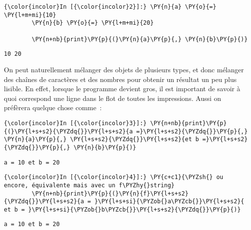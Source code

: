     \begin{Verbatim}[commandchars=\\\{\}]
{\color{incolor}In [{\color{incolor}2}]:} \PY{n}{a} \PY{o}{=} \PY{l+m+mi}{10}
        \PY{n}{b} \PY{o}{=} \PY{l+m+mi}{20}
        
        \PY{n+nb}{print}\PY{p}{(}\PY{n}{a}\PY{p}{,} \PY{n}{b}\PY{p}{)}
\end{Verbatim}


    \begin{Verbatim}[commandchars=\\\{\}]
10 20

    \end{Verbatim}

    On peut naturellement mélanger des objets de plusieurs types, et donc
mélanger des chaînes de caractères et des nombres pour obtenir un
résultat un peu plus lisible. En effet, lorsque le programme devient
gros, il est important de savoir à quoi correspond une ligne dans le
flot de toutes les impressions. Aussi on préfèrera quelque chose comme~:

    \begin{Verbatim}[commandchars=\\\{\}]
{\color{incolor}In [{\color{incolor}3}]:} \PY{n+nb}{print}\PY{p}{(}\PY{l+s+s2}{\PYZdq{}}\PY{l+s+s2}{a =}\PY{l+s+s2}{\PYZdq{}}\PY{p}{,} \PY{n}{a}\PY{p}{,} \PY{l+s+s2}{\PYZdq{}}\PY{l+s+s2}{et b =}\PY{l+s+s2}{\PYZdq{}}\PY{p}{,} \PY{n}{b}\PY{p}{)}
\end{Verbatim}


    \begin{Verbatim}[commandchars=\\\{\}]
a = 10 et b = 20

    \end{Verbatim}

    \begin{Verbatim}[commandchars=\\\{\}]
{\color{incolor}In [{\color{incolor}4}]:} \PY{c+c1}{\PYZsh{} ou encore, équivalente mais avec un f\PYZhy{}string}
        \PY{n+nb}{print}\PY{p}{(}\PY{n}{f}\PY{l+s+s2}{\PYZdq{}}\PY{l+s+s2}{a = }\PY{l+s+si}{\PYZob{}a\PYZcb{}}\PY{l+s+s2}{ et b = }\PY{l+s+si}{\PYZob{}b\PYZcb{}}\PY{l+s+s2}{\PYZdq{}}\PY{p}{)}
\end{Verbatim}


    \begin{Verbatim}[commandchars=\\\{\}]
a = 10 et b = 20

    \end{Verbatim}

